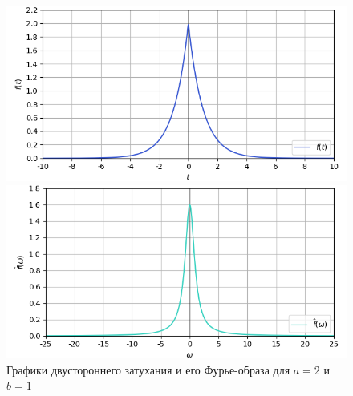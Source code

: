 \documentclass[a4paper]{article}
\begin{document}
\begin{figure}[H]
    \begin{minipage}{0.5\textwidth}
        \centering \includegraphics[width=\textwidth]{sources/5_fade/graph_2.png}
    \end{minipage}\hfill
    \begin{minipage}{0.5\textwidth}
        \centering \includegraphics[width=\textwidth]{sources/5_fade/fourier_2.png}
    \end{minipage}
    \caption{Графики двустороннего затухания и его Фурье-образа для $a = 2$ и $b = 1$} 
\end{figure}
\end{document}
